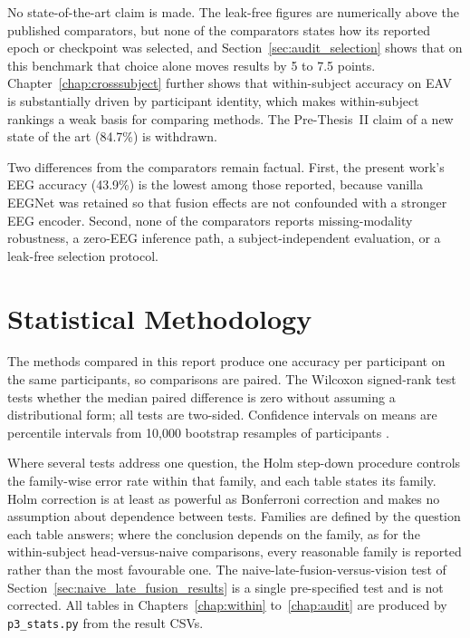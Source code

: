 No state-of-the-art claim is made. The leak-free figures are numerically above the published comparators, but none of the comparators states how its reported epoch or checkpoint was selected, and Section~\ref{sec:audit_selection} shows that on this benchmark that choice alone moves results by 5 to 7.5 points. Chapter~\ref{chap:crosssubject} further shows that within-subject accuracy on EAV is substantially driven by participant identity, which makes within-subject rankings a weak basis for comparing methods. The Pre-Thesis~II claim of a new state of the art (84.7\%) is withdrawn.

Two differences from the comparators remain factual. First, the present work's EEG accuracy (43.9\%) is the lowest among those reported, because vanilla EEGNet \cite{Lawhern2018EEGNet} was retained so that fusion effects are not confounded with a stronger EEG encoder. Second, none of the comparators reports missing-modality robustness, a zero-EEG inference path, a subject-independent evaluation, or a leak-free selection protocol.

\section{Statistical Methodology}
\label{sec:statistical_analysis}

The methods compared in this report produce one accuracy per participant on the same participants, so comparisons are paired. The Wilcoxon signed-rank test \cite{Wilcoxon1945} tests whether the median paired difference is zero without assuming a distributional form; all tests are two-sided. Confidence intervals on means are percentile intervals from 10{,}000 bootstrap resamples of participants \cite{Efron1993Bootstrap}.

Where several tests address one question, the Holm step-down procedure \cite{Holm1979} controls the family-wise error rate within that family, and each table states its family. Holm correction is at least as powerful as Bonferroni correction and makes no assumption about dependence between tests. Families are defined by the question each table answers; where the conclusion depends on the family, as for the within-subject head-versus-naive comparisons, every reasonable family is reported rather than the most favourable one. The naive-late-fusion-versus-vision test of Section~\ref{sec:naive_late_fusion_results} is a single pre-specified test and is not corrected. All tables in Chapters~\ref{chap:within} to~\ref{chap:audit} are produced by \texttt{p3\_stats.py} from the result CSVs.

